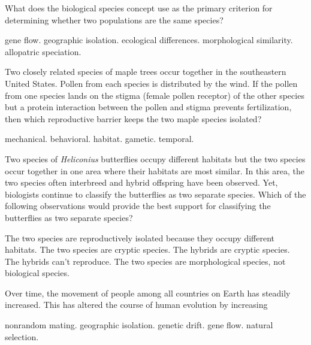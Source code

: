 \question
What does the biological species concept use as the primary criterion for determining whether two populations are the same species?

\begin{choices}
\correctchoice gene flow.   %
\choice geographic isolation.   %
\choice ecological differences.   %
\choice morphological similarity.   %
\choice allopatric speciation.   %
\end{choices}



\question
Two closely related species of maple trees occur together in the southeastern United States.  Pollen from each species is distributed by the wind.  If the pollen from one species lands on the stigma (female pollen receptor) of the other species but a protein interaction between the pollen and stigma prevents fertilization, then which reproductive barrier keeps the two maple species isolated?

\begin{choices}
\choice mechanical.%
\choice behavioral.%
\choice habitat.%
\correctchoice gametic.%
\choice temporal.%
\end{choices}

\question
Two species of \textit{Heliconius} butterflies occupy different habitats but the two species occur together in one area where their habitats are most similar. In this area, the two species often interbreed and hybrid offspring have been observed.  Yet, biologists continue to classify the butterflies as two separate species.  Which of the following observations would provide the best support for classifying the butterflies as two separate species? 

\begin{choices}
\choice The two species are reproductively isolated because they occupy different habitats.%
\choice The two species are cryptic species.%
\choice The hybrids are cryptic species.%
\correctchoice The hybrids can't reproduce.%
\choice The two species are morphological species, not biological species.%
\end{choices}

\question
Over time, the movement of people among all countries on Earth has steadily increased. This has altered the course of human evolution by increasing

\begin{choices}
\choice nonrandom mating. %
\choice geographic isolation. %
\choice genetic drift. %
\correctchoice gene flow. %
\choice natural selection. %
\end{choices}

